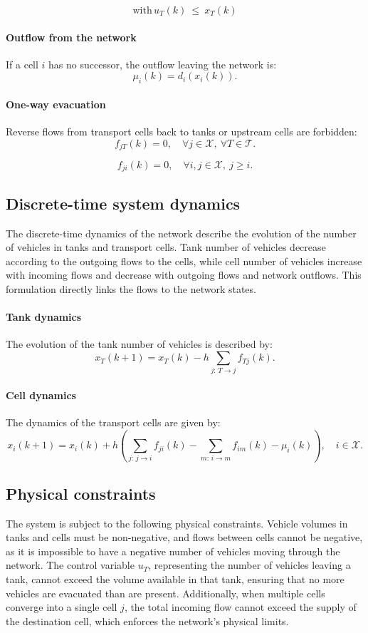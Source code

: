 \documentclass[12pt]{article}
\begin{document}
\[
    \text{with} \, u_T(k)\ \le \ x_T(k)
\]

\paragraph{Outflow from the network}

If a cell $i$ has no successor, the outflow leaving the network is:
\[
\mu_i(k) = d_i(x_i(k)).
\]

\paragraph{One-way evacuation}

Reverse flows from transport cells back to tanks or upstream cells are forbidden:
\[
f_{jT}(k) = 0, \quad \forall j \in \mathcal{X},\ \forall T \in \mathcal{T}.
\]

\[
f_{ji}(k) = 0, \quad \forall i,j \in \mathcal{X},\ j \ge i.
\]

\subsection{Discrete-time system dynamics}

The discrete-time dynamics of the network describe the evolution of the number of vehicles in tanks and transport cells. Tank number of vehicles decrease according to the outgoing flows to the cells, while cell number of vehicles increase with incoming flows and decrease with outgoing flows and network outflows. This formulation directly links the flows to the network states.


\paragraph{Tank dynamics}

The evolution of the tank number of vehicles is described by:
\[
x_T(k+1) = x_T(k) - h \sum_{j:\,T \to j} f_{Tj}(k).
\]

\paragraph{Cell dynamics}

The dynamics of the transport cells are given by:
\[
x_i(k+1) = x_i(k)
+ h \left(
\sum_{j:\,j \to i} f_{ji}(k)
- \sum_{m:\,i \to m} f_{im}(k)
- \mu_i(k)
\right),
\quad i \in \mathcal{X}.
\]

\subsection{Physical constraints}
The system is subject to the following physical constraints. Vehicle volumes in tanks and cells must be non-negative, and flows between cells cannot be negative, as it is impossible to have a negative number of vehicles moving through the network. The control variable $u_T$, representing the number of vehicles leaving a tank, cannot exceed the volume available in that tank, ensuring that no more vehicles are evacuated than are present. Additionally, when multiple cells converge into a single cell $j$, the total incoming flow cannot exceed the supply of the destination cell, which enforces the network's physical limits.
\end{document}
